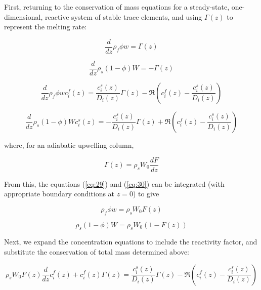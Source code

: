 \documentclass[11pt]{article}
\begin{document}
First, returning to the conservation of mass equations for a steady-state, one-dimensional, reactive system of stable trace elements, and using $\Gamma(z)$ to represent the melting rate:

\begin{equation}
    \frac{d}{dz} \rho_f \phi w = \Gamma(z)\label{eq:29}
\end{equation}

\begin{equation}
    \frac{d}{dz} \rho_s (1-\phi) W = -\Gamma(z)\label{eq:30}
\end{equation}

\begin{equation}
    \frac{d}{dz} \rho_f \phi w c_i^f(z) = \frac{c_i^s(z)}{D_i(z)}\Gamma(z) - \Re\left(c_i^f(z) - \frac{c_i^s(z)}{D_i(z)}\right)\label{eq:31}
\end{equation}

\begin{equation}
    \frac{d}{dz} \rho_s (1-\phi) W c_i^s(z) = -\frac{c_i^s(z)}{D_i(z)}\Gamma(z) + \Re\left(c_i^f(z) - \frac{c_i^s(z)}{D_i(z)}\right)\label{eq:32}
\end{equation}

where, for an adiabatic upwelling column,

\begin{equation}
    \Gamma(z) = \rho_s W_0 \frac{dF}{dz}\label{eq:33}
\end{equation}

From this, the equations (\ref{eq:29}) and (\ref{eq:30}) can be integrated (with appropriate boundary conditions at $z=0$) to give

\begin{equation}
    \rho_f \phi w = \rho_s W_0 F(z)\label{eq:34}
\end{equation}

\begin{equation}
    \rho_s (1-\phi) W = \rho_s W_0 (1 - F(z))\label{eq:35}
\end{equation}

Next, we expand the concentration equations to include the reactivity factor, and substitute the conservation of total mass determined above:

\begin{equation}
    \rho_s W_0 F(z)\frac{d}{dz} c_i^f(z) + c_i^f(z)\Gamma(z) = \frac{c_i^s(z)}{D_i(z)}\Gamma(z) -\Re\left(c_i^f(z) - \frac{c_i^s(z)}{D_i(z)}\right)\label{eq:36}
\end{equation}
\end{document}
